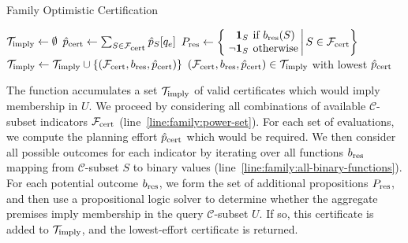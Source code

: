 \begin{algorithm}
\caption{Family Optimistic Certification}
\label{alg:family:opt-edge-plan}
\begin{algorithmic}[1]
   \State $\mathcal{T}_{\mbox{\scriptsize imply}} \leftarrow \emptyset$
         \label{line:family:power-set}
      \State ${\hat p}_{\mbox{\scriptsize cert}} \leftarrow \sum_{S \in \mathcal{F}_{\mbox{\scriptsize cert}}} \hat{p}_S[q_e]$
            \label{line:family:all-binary-functions}
         \State $\arraycolsep=2pt
            P_{\ms{res}} \leftarrow
            \left\{\left. \begin{array}{rl}
            \mathbf{1}_S & \mbox{if } b_{\ms{res}}(S) \\
            \lnot \mathbf{1}_S & \mbox{otherwise} \\
            \end{array}
            \right|
            S \in \mathcal{F}_{\ms{cert}}
            \right\}$
            \State $\mathcal{T}_{\mbox{\scriptsize imply}} \leftarrow
               \mathcal{T}_{\mbox{\scriptsize imply}} \cup
               \{ (\mathcal{F}_{\mbox{\scriptsize cert}}, b_{\mbox{\scriptsize res}}, {\hat p}_{\mbox{\scriptsize cert}}) \}$
         \EndIf
      \EndFor
   \EndFor
   \State \Return $(\mathcal{F}_{\mbox{\scriptsize cert}}, b_{\mbox{\scriptsize res}}, {\hat p}_{\mbox{\scriptsize cert}})
      \in \mathcal{T}_{\mbox{\scriptsize imply}}$
      with lowest ${\hat p}_{\mbox{\scriptsize cert}}$
\EndFunction
\end{algorithmic}
\end{algorithm}

The function accumulates a set $\mathcal{T}_{\mbox{\scriptsize imply}}$ of
valid certificates which would imply membership in $U$.
We proceed by considering all combinations of
available $\mathcal{C}$-subset indicators
$\mathcal{F}_{\mbox{\scriptsize cert}}$ (line~\ref{line:family:power-set}).
For each set of evaluations,
we compute the planning effort ${\hat p}_{\mbox{\scriptsize cert}}$
which would be required.
We then consider all possible outcomes for each indicator
by iterating over all functions $b_{\mbox{\scriptsize res}}$ mapping
from $\mathcal{C}$-subset $S$ to binary values
(line~\ref{line:family:all-binary-functions}).
For each potential outcome $b_{\mbox{\scriptsize res}}$,
we form the set of additional propositions $P_{\mbox{\scriptsize res}}$,
and then use a propositional logic solver to determine whether
the aggregate premises imply membership
in the query $\mathcal{C}$-subset $U$.
If so, this certificate is added to $\mathcal{T}_{\mbox{\scriptsize imply}}$,
and the lowest-effort certificate is returned.


